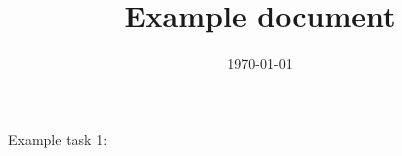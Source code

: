\documentclass{article}
\title{Example document}
\date{\today}
\begin{document}
\maketitle

\section{}
\label{sec:intro}
Example task 1: 

\listoftodos
\end{document}
